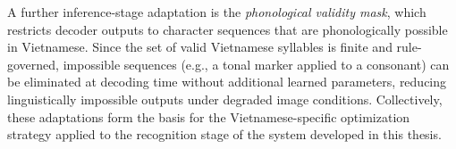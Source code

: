 A further inference-stage adaptation is the \textit{phonological validity mask}, which restricts decoder outputs to character sequences that are phonologically possible in Vietnamese. Since the set of valid Vietnamese syllables is finite and rule-governed, impossible sequences (e.g., a tonal marker applied to a consonant) can be eliminated at decoding time without additional learned parameters, reducing linguistically impossible outputs under degraded image conditions. Collectively, these adaptations form the basis for the Vietnamese-specific optimization strategy applied to the recognition stage of the system developed in this thesis.
